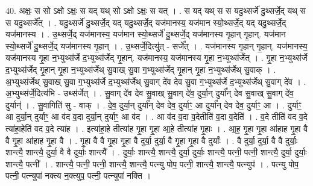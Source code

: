 \documentclass[17pt]{extarticle}
\begin{document}
40. अक्षः॒ स सो ऽक्षो ऽक्षः॒ स यद् यथ् सो ऽक्षो ऽक्षः॒ स यत् । . स यद् यथ् स स यदु॒थ्सर्जे॑ दु॒थ्सर्जे॒द् यथ् स स यदु॒थ्सर्जे᳚त् । . यदु॒थ्सर्जे॑ दु॒थ्सर्जे॒द् यद् यदु॒थ्सर्जे॒द् यज॑मानस्य॒ यज॑मान स्यो॒थ्सर्जे॒द् यद् यदु॒थ्सर्जे॒द् यज॑मानस्य । . उ॒थ्सर्जे॒द् यज॑मानस्य॒ यज॑मान स्यो॒थ्सर्जे॑ दु॒थ्सर्जे॒द् यज॑मानस्य गृ॒हान् गृ॒हान्. यज॑मान स्यो॒थ्सर्जे॑ दु॒थ्सर्जे॒द् यज॑मानस्य गृ॒हान् । . उ॒थ्सर्जे॒दित्यु॑त् - सर्जे᳚त् । . यज॑मानस्य गृ॒हान् गृ॒हान्. यज॑मानस्य॒ यज॑मानस्य गृ॒हा न॒भ्युथ्स॑र्जे द॒भ्युथ्स॑र्जेद् गृ॒हान्. यज॑मानस्य॒ यज॑मानस्य गृ॒हा न॒भ्युथ्स॑र्जेत् । . गृ॒हा न॒भ्युथ्स॑र्जे द॒भ्युथ्स॑र्जेद् गृ॒हान् गृ॒हा न॒भ्युथ्स॑र्जेथ् सु॒वाख् सु॒वा ग॒भ्युथ्स॑र्जेद् गृ॒हान् गृ॒हा न॒भ्युथ्स॑र्जेथ् सु॒वाक् । . अ॒भ्युथ्स॑र्जेथ् सु॒वाख् सु॒वा ग॒भ्युथ्स॑र्जे द॒भ्युथ्स॑र्जेथ् सु॒वाग् दे॑व देव सु॒वा ग॒भ्युथ्स॑र्जे द॒भ्युथ्स॑र्जेथ् सु॒वाग् दे॑व । . अ॒भ्युथ्स॑र्जे॒दित्य॑भि - उथ्स॑र्जेत् । . सु॒वाग् दे॑व देव सु॒वाख् सु॒वाग् दे॑व॒ दुर्या॒न् दुर्या᳚न् देव सु॒वाख् सु॒वाग् दे॑व॒ दुर्यान्॑ । . सु॒वागिति॑ सु - वाक् । . दे॒व॒ दुर्या॒न् दुर्या᳚न् देव देव॒ दुर्याꣳ॒॒ आ दुर्या᳚न् देव देव॒ दुर्याꣳ॒॒ आ । . दुर्याꣳ॒॒ आ दुर्या॒न् दुर्याꣳ॒॒ आ व॑द व॒दा दुर्या॒न् दुर्याꣳ॒॒ आ व॑द । . आ व॑द व॒दा व॒देतीति॑ व॒दा व॒देति॑ । . व॒दे तीति॑ वद व॒दे त्या॑हा॒हेति॑ वद व॒दे त्या॑ह । . इत्या॑हा॒हे तीत्या॑ह गृ॒हा गृ॒हा आ॒हे तीत्या॑ह गृ॒हाः । . आ॒ह॒ गृ॒हा गृ॒हा आ॑हाह गृ॒हा वै वै गृ॒हा आ॑हाह गृ॒हा वै । . गृ॒हा वै वै गृ॒हा गृ॒हा वै दुर्या॒ दुर्या॒ वै गृ॒हा गृ॒हा वै दुर्याः᳚ । . वै दुर्या॒ दुर्या॒ वै वै दुर्याः॒ शान्त्यै॒ शान्त्यै॒ दुर्या॒ वै वै दुर्याः॒ शान्त्यै᳚ । . दुर्याः॒ शान्त्यै॒ शान्त्यै॒ दुर्या॒ दुर्याः॒ शान्त्यै॒ पत्नी॒ पत्नी॒ शान्त्यै॒ दुर्या॒ दुर्याः॒ शान्त्यै॒ पत्नी᳚ । . शान्त्यै॒ पत्नी॒ पत्नी॒ शान्त्यै॒ शान्त्यै॒ पत्न्यु पोप॒ पत्नी॒ शान्त्यै॒ शान्त्यै॒ पत्न्युप॑ । . पत्न्यु पोप॒ पत्नी॒ पत्न्युपा॑ नक्त्य न॒क्त्युप॒ पत्नी॒ पत्न्युपा॑ नक्ति । \newline
\pagebreak
{}
\end{document}
